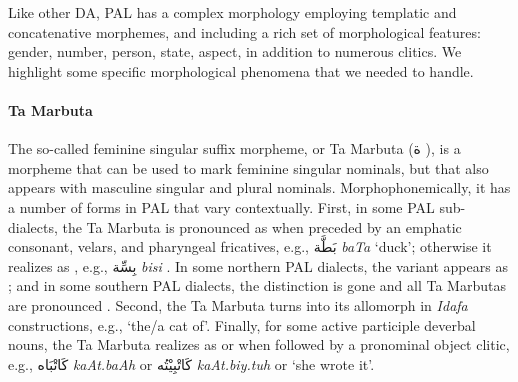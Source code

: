 Like other DA, PAL has a complex morphology employing templatic and concatenative morphemes, and including a  rich set of morphological features: gender, number, person, state, aspect, in addition to numerous clitics.  We highlight some specific morphological phenomena that we needed to handle.

\paragraph{Ta Marbuta}
The so-called feminine singular suffix morpheme, or Ta Marbuta (\foreignlanguage{arabic}{ة} \TAMARBUTA), is a morpheme that can be used to mark feminine singular nominals, but that also appears with masculine singular and plural nominals.
Morphophonemically, it has a number of forms in PAL that vary contextually. 
%
First, in some PAL sub-dialects, the Ta Marbuta is pronounced as  when preceded by an emphatic consonant,  velars, and pharyngeal fricatives, e.g., 
\foreignlanguage{arabic}{بَطَّة}
{\it baT{\SHADDA}a{\TAMARBUTA}}
`duck'; otherwise it realizes as , e.g., \foreignlanguage{arabic}{بِسِّة}
{\it bis{\SHADDA}i{\TAMARBUTA}}
. 
In some northern PAL dialects, the  variant appears as ; and in some southern PAL dialects, the distinction is gone and all Ta Marbutas are pronounced .
%
Second, the Ta Marbuta turns into its allomorph  in {\it Idafa} constructions, e.g.,  `the/a cat of'. 
Finally, for some active participle deverbal nouns, the Ta Marbuta realizes as  or  when followed by a pronominal object clitic, e.g., \foreignlanguage{arabic}{كَاتْبَاه}
{\it kaAt.baAh}  or \foreignlanguage{arabic}{كَاتْبِيْتُه}
{\it kaAt.biy.tuh} or  `she wrote it'.





